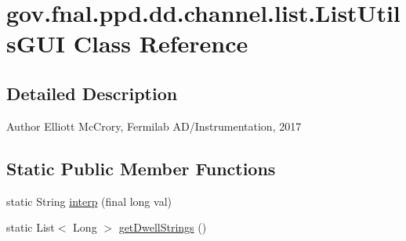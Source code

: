 \hypertarget{classgov_1_1fnal_1_1ppd_1_1dd_1_1channel_1_1list_1_1ListUtilsGUI}{\section{gov.\-fnal.\-ppd.\-dd.\-channel.\-list.\-List\-Utils\-G\-U\-I Class Reference}
\label{classgov_1_1fnal_1_1ppd_1_1dd_1_1channel_1_1list_1_1ListUtilsGUI}
}


\subsection{Detailed Description}
\begin{DoxyAuthor}{Author}
Elliott Mc\-Crory, Fermilab A\-D/\-Instrumentation, 2017 
\end{DoxyAuthor}
\subsection*{Static Public Member Functions}
\begin{DoxyCompactItemize}
\item 
static String \hyperlink{classgov_1_1fnal_1_1ppd_1_1dd_1_1channel_1_1list_1_1ListUtilsGUI_a74040be8d5ff5ec79cf33db62e1ee673}{interp} (final long val)
\item 
static List$<$ Long $>$ \hyperlink{classgov_1_1fnal_1_1ppd_1_1dd_1_1channel_1_1list_1_1ListUtilsGUI_acf82b25a88214152cebb51e1d9ae2bb1}{get\-Dwell\-Strings} ()
\end{DoxyCompactItemize}


